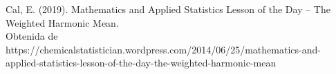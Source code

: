 \documentclass{article}
\begin{document}
\begin{thebibliography}{1}

Cal, E. (2019). Mathematics and Applied Statistics Lesson of the Day – The Weighted Harmonic Mean.\\ 
Obtenida de https://chemicalstatistician.wordpress.com/2014/06/25/mathematics-and-applied-statistics-lesson-of-the-day-the-weighted-harmonic-mean

\end{thebibliography}
\end{document}
